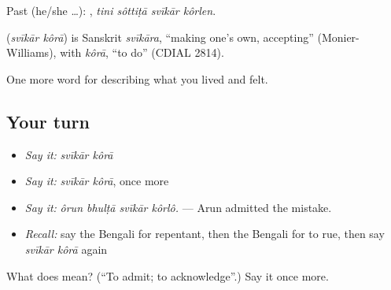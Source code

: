 Past (he/she …):    , \emph{tini sôttiṭā svīkār kôrlen}.

\begin{cousinweb}
\textbf{ } (\emph{svīkār kôrā}) is Sanskrit \emph{svīkāra}, \textquotedblleft{}making one's own, accepting\textquotedblright{} (Monier-Williams), with \emph{kôrā}, \textquotedblleft{}to do\textquotedblright{} (CDIAL 2814).
\end{cousinweb}

\begin{grammarlens}[title={What you've built}]
One more word for describing what you lived and felt.
\end{grammarlens}

\subsection*{Your turn}
\begin{itemize}
\raggedright
  \item \emph{Say it:} \emph{svīkār kôrā}
  \item \emph{Say it:} \emph{svīkār kôrā}, once more
  \item \emph{Say it:} \emph{ôrun bhulṭā svīkār kôrlô.} — Arun admitted the mistake.
  \item \emph{Recall:} say the Bengali for repentant, then the Bengali for to rue, then say \emph{svīkār kôrā} again
\end{itemize}

\begin{tcolorbox}[breakable,colback=teal!4,colframe=teal!35!black,title={Before you move on}]
What does   mean? (\textquotedblleft{}To admit; to acknowledge\textquotedblright{}.) Say it once more.
\end{tcolorbox}
